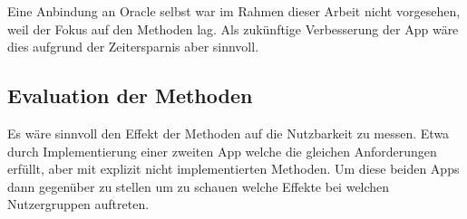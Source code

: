 \documentclass[oneside,bibliography=totocnumbered,BCOR=5mm]{scrbook}
\begin{document}
Eine Anbindung an Oracle selbst war im Rahmen dieser Arbeit nicht vorgesehen,
weil der Fokus auf den Methoden lag. Als zukünftige Verbesserung der App wäre
dies aufgrund der Zeitersparnis aber sinnvoll.

\subsection{Evaluation der Methoden}

Es wäre sinnvoll den Effekt der Methoden auf die Nutzbarkeit zu messen. Etwa
durch Implementierung einer zweiten App welche die gleichen Anforderungen
erfüllt, aber mit explizit nicht implementierten Methoden. Um diese beiden Apps
dann gegenüber zu stellen um zu schauen welche Effekte bei welchen Nutzergruppen
auftreten.

\end{document}
